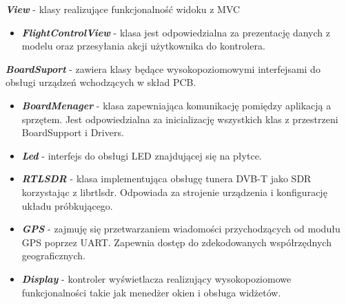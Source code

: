 \documentclass[eng,printmode]{mgr}
\begin{document}
\noindent
\textbf{\textit{View}} - klasy realizujące funkcjonalność widoku z MVC
\begin{itemize}[label={}]
  \item \textbf{\textit{FlightControlView}} - klasa jest odpowiedzialna za prezentację danych z modelu oraz przesyłania akcji użytkownika do kontrolera.
\end{itemize}
\vskip 0.55cm

\noindent
\textbf{\textit{BoardSuport}} - zawiera klasy będące wysokopoziomowymi interfejsami do obsługi urządzeń wchodzących w skład PCB. 
\begin{itemize}[label={}]
  \item \textbf{\textit{BoardMenager}} - klasa zapewniająca komunikację pomiędzy aplikacją a sprzętem. Jest odpowiedzialna za inicializację wszystkich klas z przestrzeni BoardSupport i Drivers.
  \item \textbf{\textit{Led}} - interfejs do obsługi LED znajdującej się na płytce.
  \item \textbf{\textit{RTLSDR}} - klasa implementująca obsługę tunera DVB-T jako SDR korzystając z librtlsdr. Odpowiada za strojenie urządzenia i konfigurację układu próbkującego. 
  \item \textbf{\textit{GPS}} - zajmuję się przetwarzaniem wiadomości przychodzących od modułu GPS poprzez UART. Zapewnia dostęp do zdekodowanych współrzędnych geograficznych.
  \item \textbf{\textit{Display}} - kontroler wyświetlacza realizujący wysokopoziomowe funkcjonalności takie jak menedżer okien i obsługa widżetów.
\end{itemize}
\vskip 0.55cm
\end{document}
